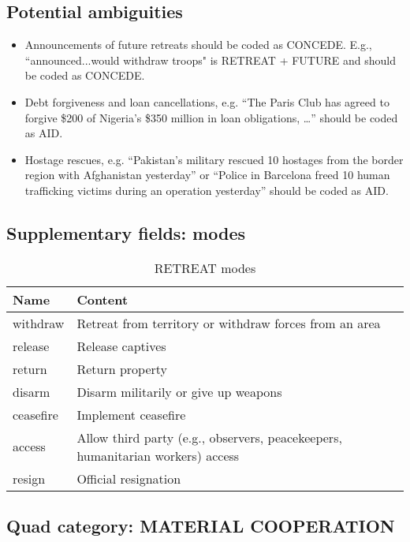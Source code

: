 \documentclass[11pt]{report}
\newcommand{\plcat}[1]{\textsf{#1}}
\begin{document}
\subsection{Potential ambiguities}

\begin{itemize}
\item Announcements of future retreats should be coded as \plcat{CONCEDE}. E.g., ``announced...would withdraw troops" is \plcat{RETREAT} + \plcat{FUTURE} and should be coded as \plcat{CONCEDE}.
\item Debt forgiveness and loan cancellations, e.g. ``The Paris Club has agreed to forgive \$200 of Nigeria’s \$350 million in loan obligations, \dots'' should be coded as \plcat{AID}.
\item Hostage rescues, e.g. ``Pakistan’s military rescued 10 hostages from the border region with Afghanistan yesterday'' or ``Police in Barcelona freed 10 human trafficking victims during an operation yesterday'' should be coded as \plcat{AID}.
\end{itemize}

\subsection{Supplementary fields: modes}

\begin{table}[htp]
\caption{RETREAT modes}
\begin{center}
\begin{tabular}{|l|p{13cm}|}
\hline
Name & Content \\
\hline
withdraw & Retreat from territory or withdraw forces from an area\\
release & Release captives \\
return & Return property \\
disarm & Disarm militarily or give up weapons\\
ceasefire & Implement ceasefire\\
access & Allow third party (e.g., observers, peacekeepers, humanitarian workers) access \\
resign & Official resignation \\
\hline
\end{tabular}
\end{center}
\label{tab:retreatmode}
\end{table}%

\subsection{Quad category: MATERIAL COOPERATION}
\end{document}
